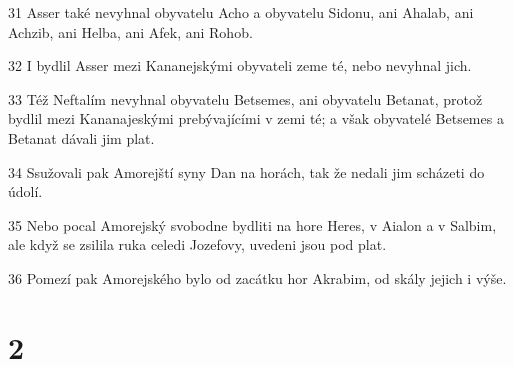 \par 31 Asser také nevyhnal obyvatelu Acho a obyvatelu Sidonu, ani Ahalab, ani Achzib, ani Helba, ani Afek, ani Rohob.
\par 32 I bydlil Asser mezi Kananejskými obyvateli zeme té, nebo nevyhnal jich.
\par 33 Též Neftalím nevyhnal obyvatelu Betsemes, ani obyvatelu Betanat, protož bydlil mezi Kananajeskými prebývajícími v zemi té; a však obyvatelé Betsemes a Betanat dávali jim plat.
\par 34 Ssužovali pak Amorejští syny Dan na horách, tak že nedali jim scházeti do údolí.
\par 35 Nebo pocal Amorejský svobodne bydliti na hore Heres, v Aialon a v Salbim, ale když se zsilila ruka celedi Jozefovy, uvedeni jsou pod plat.
\par 36 Pomezí pak Amorejského bylo od zacátku hor Akrabim, od skály jejich i výše.

\chapter{2}

